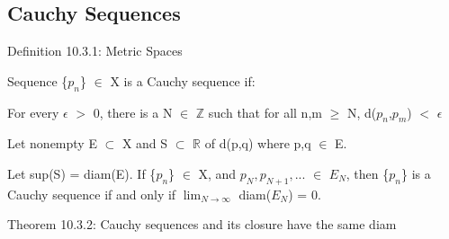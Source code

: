 \subsection{ Cauchy Sequences }

{ \color{blue} Definition 10.3.1: Metric Spaces } 

	\begin{adjustbox}{minipage=14cm, right, vspace=0.1cm 0cm}
        Sequence \{$p_n$\} $\in$ X is a Cauchy sequence if:

        \hspace{0.5cm}
        For every $\epsilon$ $>$ 0, there is a N $\in$ $\mathbb{Z}$ such that
        for all n,m $\geq$ N, d($p_n$,$p_m$) $<$ $\epsilon$

        Let nonempty E $\subset$ X and S $\subset$ $\mathbb{R}$ of 
        d(p,q) where p,q $\in$ E.
        
        Let sup(S) = diam(E).
        If \{$p_n$\} $\in$ X, and $p_N, p_{N+1}, ... $ $\in$ $E_N$, then
        \{$p_n$\} is a Cauchy sequence if and only if
        $\lim_{N \rightarrow \infty}$ diam($E_N$) = 0. \\
    \end{adjustbox}

\newpage

{ \color{red} Theorem 10.3.2: Cauchy sequences and its closure have the same diam }

